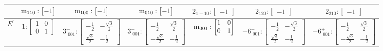 \documentclass[fleqn,8pt,landscape]{jsarticle}
\begin{document}
\begin{longtable}{ccccccc}
& $ {\rm m}_{110}:\begin{bmatrix} -1 \end{bmatrix} $ & $ {\rm m}_{100}:\begin{bmatrix} -1 \end{bmatrix} $ & $ {\rm m}_{010}:\begin{bmatrix} -1 \end{bmatrix} $ & $ 2{}_{1-10}:\begin{bmatrix} -1 \end{bmatrix} $ & $ 2{}_{120}:\begin{bmatrix} -1 \end{bmatrix} $ & $ 2{}_{210}:\begin{bmatrix} -1 \end{bmatrix} $ \\ \hline
$ E^{\prime} $ & $ 1:\begin{bmatrix} 1 & 0 \\ 0 & 1 \end{bmatrix} $ & $ 3^{+}_{\,\,001}:\begin{bmatrix} - \frac{1}{2} & - \frac{\sqrt{3}}{2} \\ \frac{\sqrt{3}}{2} & - \frac{1}{2} \end{bmatrix} $ & $ 3^{-}_{\,\,001}:\begin{bmatrix} - \frac{1}{2} & \frac{\sqrt{3}}{2} \\ - \frac{\sqrt{3}}{2} & - \frac{1}{2} \end{bmatrix} $ & $ {\rm m}_{001}:\begin{bmatrix} 1 & 0 \\ 0 & 1 \end{bmatrix} $ & $ -6^{-}_{\,\,001}:\begin{bmatrix} - \frac{1}{2} & - \frac{\sqrt{3}}{2} \\ \frac{\sqrt{3}}{2} & - \frac{1}{2} \end{bmatrix} $ & $ -6^{+}_{\,\,001}:\begin{bmatrix} - \frac{1}{2} & \frac{\sqrt{3}}{2} \\ - \frac{\sqrt{3}}{2} & - \frac{1}{2} \end{bmatrix} $ \\

\end{longtable}
\end{document}
